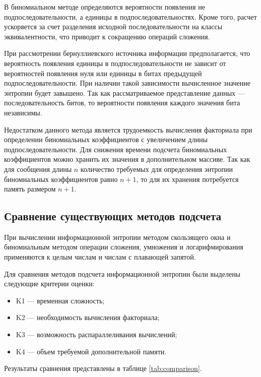 В биномиальном методе определяются вероятности появления не подпоследовательности, а единицы в подпоследовательностях. Кроме того, расчет ускоряется за счет разделения исходной последовательности на классы эквивалентности, что приводит к сокращению операций сложения.

При рассмотрении бернуллиевского источника информации предполагается, что вероятность появления единицы в подпоследовательности не зависит от вероятностей появления нуля или единицы в битах предыдущей подпоследовательности. При наличии такой зависимости вычисленное значение энтропии будет завышено. Так как рассматриваемое представление данных --- последовательность битов, то вероятности появления каждого значения бита независимы. 

Недостатком данного метода является трудоемкость вычисления факториала при определении биномиальных коэффициентов с увеличением длины подпоследовательности. Для снижения времени подсчета биномиальных коэффициентов можно хранить их значения в дополнительном массиве. Так как для сообщения длины $n$ количество требуемых для определения энтропии биномиальных коэффициентов равно $n + 1$, то для их хранения потребуется память размером $n + 1$.

\subsection{Сравнение существующих методов подсчета}

При вычислении информационной энтропии методом скользящего окна и биномиальным методом операции сложения, умножения и логарифмирования применяются к целым числам и числам с плавающей запятой.

Для сравнения методов подсчета информационной энтропии были выделены следующие критерии оценки:

\begin{itemize}
	\item K1 --- временная сложность;
	\item K2 --- необходимость вычисления факториала;
	\item K3 --- возможность распараллеливания вычислений;
	\item K4 --- объем требуемой дополнительной памяти.
\end{itemize}

Результаты сравнения представлены в таблице \ref{tab:comparison}.

